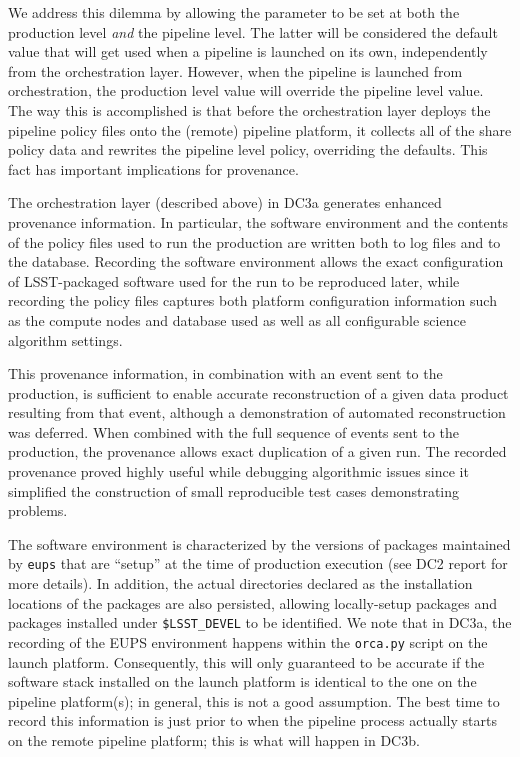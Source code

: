 We address this dilemma by allowing the parameter to be set at both
the production level {\it and} the pipeline level.  The latter will be
considered the default value that will get used when a pipeline is
launched on its own, independently from the orchestration layer.
However, when the pipeline is launched from orchestration, the
production level value will override the pipeline level value.  The
way this is accomplished is that before the orchestration layer
deploys the pipeline policy files onto the (remote) pipeline platform,
it collects all of the share policy data and rewrites the pipeline
level policy, overriding the defaults.  This fact has important
implications for provenance.  


  \label{sec:provenance}

The orchestration layer (described above) in DC3a generates enhanced
provenance information.  In particular, the software environment and
the contents of the policy files used to run the production are
written both to log files and to the database.  Recording the software
environment allows the exact configuration of LSST-packaged software
used for the run to be reproduced later, while recording the policy
files captures both platform configuration information such as the
compute nodes and database used as well as all configurable science
algorithm settings.

This provenance information, in combination with an event sent to the
production, is sufficient to enable accurate reconstruction of a given
data product resulting from that event, although a demonstration of
automated reconstruction was deferred.  When combined with the full
sequence of events sent to the production, the provenance allows exact
duplication of a given run.  The recorded provenance proved highly
useful while debugging algorithmic issues since it simplified the
construction of small reproducible test cases demonstrating problems.

The software environment is characterized by the versions of packages
maintained by {\tt eups} that are ``setup'' at the time of production
execution (see DC2 report for more details).  In addition, the actual
directories declared as the installation locations of the packages are
also persisted, allowing locally-setup packages and packages installed
under {\tt \$LSST\_DEVEL} to be identified.  We note that in DC3a, the
recording of the EUPS environment happens within the {\tt orca.py}
script on the launch platform.  Consequently, this will only
guaranteed to be accurate if the software stack installed on the
launch platform is identical to the one on the pipeline platform(s);
in general, this is not a good assumption.  The best time to record
this information is just prior to when the pipeline process actually
starts on the remote pipeline platform; this is what will happen in
DC3b.  

